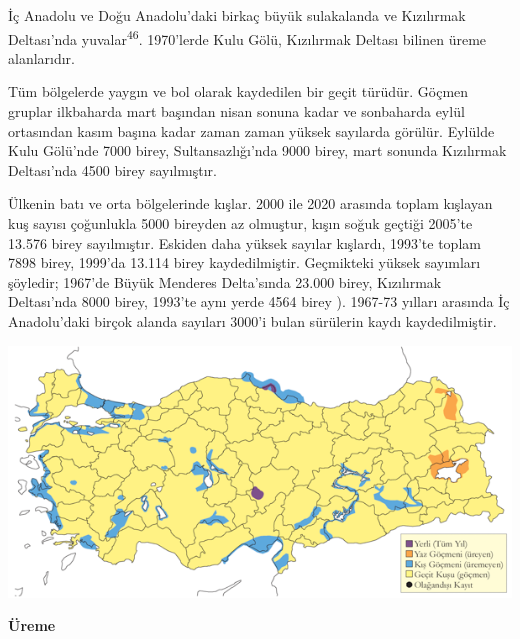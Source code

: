 \documentclass[
  letterpaper,
  DIV=11,
  numbers=noendperiod]{scrreprt}
\begin{document}
İç Anadolu ve Doğu Anadolu'daki birkaç büyük sulakalanda ve Kızılırmak
Deltası'nda yuvalar\textsuperscript{46}. 1970'lerde Kulu Gölü,
Kızılırmak Deltası bilinen üreme alanlarıdır.

Tüm bölgelerde yaygın ve bol olarak kaydedilen bir geçit türüdür. Göçmen
gruplar ilkbaharda mart başından nisan sonuna kadar ve sonbaharda eylül
ortasından kasım başına kadar zaman zaman yüksek sayılarda görülür.
Eylülde Kulu Gölü'nde 7000 birey, Sultansazlığı'nda 9000 birey, mart
sonunda Kızılırmak Deltası'nda 4500 birey sayılmıştır.

Ülkenin batı ve orta bölgelerinde kışlar. 2000 ile 2020 arasında toplam
kışlayan kuş sayısı çoğunlukla 5000 bireyden az olmuştur, kışın soğuk
geçtiği 2005'te 13.576 birey sayılmıştır. Eskiden daha yüksek sayılar
kışlardı, 1993'te toplam 7898 birey, 1999'da 13.114 birey
kaydedilmiştir. Geçmikteki yüksek sayımları şöyledir; 1967'de Büyük
Menderes Delta'sında 23.000 birey, Kızılırmak Deltası'nda 8000 birey,
1993'te aynı yerde 4564 birey ). 1967-73 yılları arasında İç
Anadolu'daki birçok alanda sayıları 3000'i bulan sürülerin kaydı
kaydedilmiştir.

\includegraphics{images/harita_Page_017.png}

\textbf{Üreme}
\end{document}
